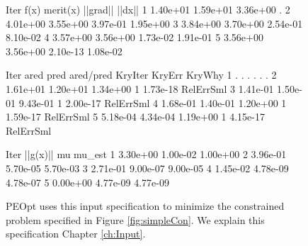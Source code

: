\begin{figure}
    \begin{lstPeopt}
Iter      f(x)      merit(x)  ||grad||  ||dx||    
1         1.40e+01  1.59e+01  3.36e+00  .         
2         4.01e+00  3.55e+00  3.97e-01  1.95e+00  
3         3.84e+00  3.70e+00  2.54e-01  8.10e-02  
4         3.57e+00  3.56e+00  1.73e-02  1.91e-01  
5         3.56e+00  3.56e+00  2.10e-13  1.08e-02 
\end{lstPeopt}
    \begin{lstPeopt}
Iter      ared      pred      ared/pred KryIter   KryErr    KryWhy    
1         .         .         .         .         .         .         
2         1.61e+01  1.20e+01  1.34e+00  1         1.73e-18  RelErrSml 
3         1.41e-01  1.50e-01  9.43e-01  1         2.00e-17  RelErrSml 
4         1.68e-01  1.40e-01  1.20e+00  1         1.59e-17  RelErrSml 
5         5.18e-04  4.34e-04  1.19e+00  1         4.15e-17  RelErrSml
\end{lstPeopt}
    \begin{lstPeopt}
Iter      ||g(x)||  mu        mu_est    
1         3.30e+00  1.00e-02  1.00e+00  
2         3.96e-01  5.70e-05  5.70e-03  
3         2.71e-01  9.00e-07  9.00e-05  
4         1.45e-02  4.78e-09  4.78e-07  
5         0.00e+00  4.77e-09  4.77e-09  
\end{lstPeopt}
    \caption{PEOpt uses this input specification to minimize the constrained problem specified in Figure \ref{fig:simpleCon}.  We explain this specification Chapter \ref{ch:Input}.} 
    \label{fig:simpleConOut}
\end{figure}
